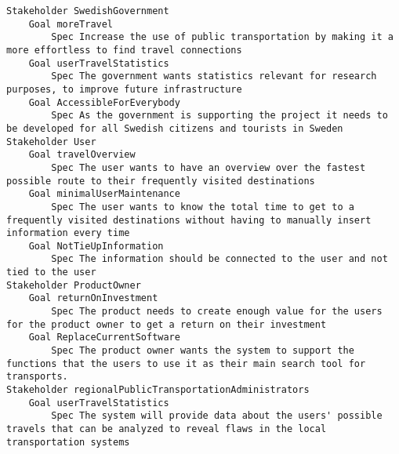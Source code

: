 

\begin{lstlisting}
Stakeholder SwedishGovernment
	Goal moreTravel
		Spec Increase the use of public transportation by making it a more effortless to find travel connections
	Goal userTravelStatistics
		Spec The government wants statistics relevant for research purposes, to improve future infrastructure
	Goal AccessibleForEverybody
		Spec As the government is supporting the project it needs to be developed for all Swedish citizens and tourists in Sweden
Stakeholder User
	Goal travelOverview
		Spec The user wants to have an overview over the fastest possible route to their frequently visited destinations
	Goal minimalUserMaintenance
		Spec The user wants to know the total time to get to a frequently visited destinations without having to manually insert information every time
	Goal NotTieUpInformation
		Spec The information should be connected to the user and not tied to the user
Stakeholder ProductOwner
	Goal returnOnInvestment
		Spec The product needs to create enough value for the users for the product owner to get a return on their investment
	Goal ReplaceCurrentSoftware
		Spec The product owner wants the system to support the functions that the users to use it as their main search tool for transports.
Stakeholder regionalPublicTransportationAdministrators
	Goal userTravelStatistics
		Spec The system will provide data about the users' possible travels that can be analyzed to reveal flaws in the local transportation systems

\end{lstlisting}